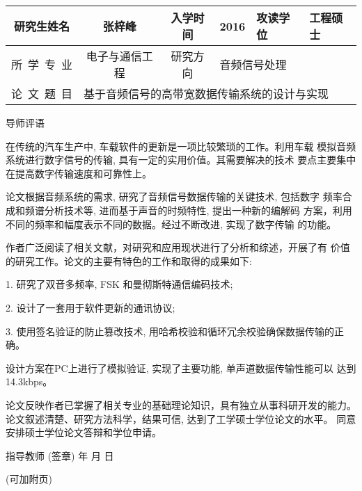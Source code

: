 \documentclass[a4paper,12pt]{article}
\newcommand*{\kaishu}{\CJKfamily{kaiti}}     %
\newcommand*{\heiti}{\CJKfamily{heiti}}     %
\begin{document}
\pagestyle{empty}
\fontsize{12}{16}\selectfont
\begin{center}
\begin{tabularx}{\textwidth}{c|c|c|c|c|X|X}
研究生姓名 & \multicolumn{2}{c|}{张梓峰} & 入学时间 & 2016 & 攻读学位
        & 工程硕士\\\hline
所~学~专~业   & \multicolumn{2}{c|}{电子与通信工程}
        & 研究方向 & \multicolumn{3}{l|}{音频信号处理}\\\hline
论~文~题~目 & \multicolumn{6}{l|}{基于音频信号的高带宽数据传输系统的设计与实现}\\\hline
\end{tabularx}
\vskip 8mm
\Large \kaishu 导师评语\end{center}

\fontsize{12}{14}\selectfont

在传统的汽车生产中, 车载软件的更新是一项比较繁琐的工作。利用车载
模拟音频系统进行数字信号的传输, 具有一定的实用价值。其需要解决的技术
要点主要集中在提高数字传输速度和可靠性上。

论文根据音频系统的需求, 研究了音频信号数据传输的关键技术, 包括数字
频率合成和频谱分析技术等, 进而基于声音的时频特性, 提出一种新的编解码
方案，利用不同的频率和幅度表示不同的数据。经过不断改进, 实现了数字传输
的功能。

作者广泛阅读了相关文献，对研究和应用现状进行了分析和综述，开展了有
价值的研究工作。论文的主要有特色的工作和取得的成果如下:

1. 研究了双音多频率, FSK 和曼彻斯特通信编码技术;

2. 设计了一套用于软件更新的通讯协议;

3. 使用签名验证的防止篡改技术, 用哈希校验和循环冗余校验确保数据传输的正确。

设计方案在PC上进行了模拟验证, 实现了主要功能, 单声道数据传输性能可以
达到14.3kbps。

论文反映作者已掌握了相关专业的基础理论知识，具有独立从事科研开发的能力。
论文叙述清楚、研究方法科学，结果可信, 达到了工学硕士学位论文的水平。
同意安排硕士学位论文答辩和学位申请。

\vfill
\hfill {\heiti 指导教师} \underline{\hskip 35mm} (签章)\qquad\qquad
\vskip 3mm
\hfill 年\hskip 12mm 月\hskip 12mm 日\qquad\qquad

\noindent(可加附页)
\end{document}
